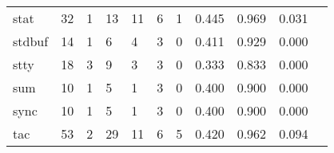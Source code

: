 \begin{longtable}{lp{1.20cm}p{1.20cm}p{1.20cm}p{1.20cm}p{1.20cm}p{1.20cm}p{1.20cm}p{1.20cm}p{1.20cm}p{1.20cm}}
stat      &                                    32 &                                                  1 &                                                 13 &                                                 11 &                                                  6 &                                                  1 &                                         0.445 &                                              0.969 &                                              0.031 \\
stdbuf    &                                    14 &                                                  1 &                                                  6 &                                                  4 &                                                  3 &                                                  0 &                                         0.411 &                                              0.929 &                                              0.000 \\
stty      &                                    18 &                                                  3 &                                                  9 &                                                  3 &                                                  3 &                                                  0 &                                         0.333 &                                              0.833 &                                              0.000 \\
sum       &                                    10 &                                                  1 &                                                  5 &                                                  1 &                                                  3 &                                                  0 &                                         0.400 &                                              0.900 &                                              0.000 \\
sync      &                                    10 &                                                  1 &                                                  5 &                                                  1 &                                                  3 &                                                  0 &                                         0.400 &                                              0.900 &                                              0.000 \\
tac       &                                    53 &                                                  2 &                                                 29 &                                                 11 &                                                  6 &                                                  5 &                                         0.420 &                                              0.962 &                                              0.094 \\

\end{longtable}
